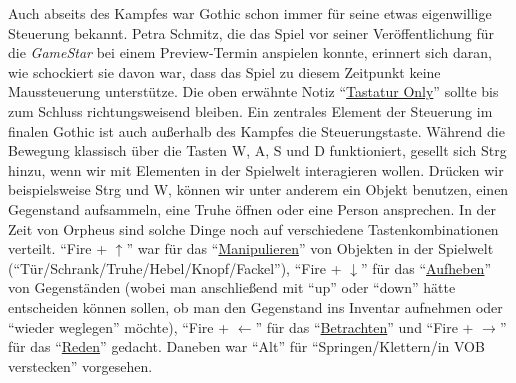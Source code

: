 \documentclass[a5paper,pagesize]{scrbook}
\begin{document}
Auch abseits des Kampfes war Gothic schon immer für seine etwas eigenwillige Steuerung bekannt.
Petra Schmitz, die das Spiel vor seiner Veröffentlichung für die \textit{GameStar} bei einem Preview-Termin anspielen konnte, erinnert sich daran, wie schockiert sie davon war, dass das Spiel zu diesem Zeitpunkt keine Maussteuerung unterstütze.\autocite{schmitz_maussteuerung}
Die oben erwähnte Notiz \enquote{\uline{Tastatur Only}}\autocite[S.~1]{orpheus_interface} sollte bis zum Schluss richtungsweisend bleiben.
Ein zentrales Element der Steuerung im finalen Gothic ist auch außerhalb des Kampfes die Steuerungstaste.
Während die Bewegung klassisch über die Tasten W, A, S und D funktioniert, gesellt sich Strg hinzu, wenn wir mit Elementen in der Spielwelt interagieren wollen.
Drücken wir beispielsweise Strg und W, können wir unter anderem ein Objekt benutzen, einen Gegenstand aufsammeln, eine Truhe öffnen oder eine Person ansprechen.
In der Zeit von Orpheus sind solche Dinge noch auf verschiedene Tastenkombinationen verteilt.
\enquote{Fire + $\uparrow$} war für das \enquote{\uline{Manipulieren}} von Objekten in der Spielwelt (\enquote{Tür/Schrank/Truhe/Hebel/Knopf/Fackel}), \enquote{Fire + $\downarrow$} für das \enquote{\uline{Aufheben}} von Gegenständen (wobei man anschließend mit \enquote{up} oder \enquote{down} hätte entscheiden können sollen, ob man den Gegenstand ins Inventar aufnehmen oder \enquote{wieder weglegen} möchte), \enquote{Fire + $\leftarrow$} für das \enquote{\uline{Betrachten}} und \enquote{Fire + $\rightarrow$} für das \enquote{\uline{Reden}} gedacht.\autocite[S.~2]{orpheus_interface}
Daneben war \enquote{Alt} für \enquote{Springen/Klettern/in VOB verstecken} vorgesehen.\autocite[S.~3]{orpheus_interface}
\end{document}
